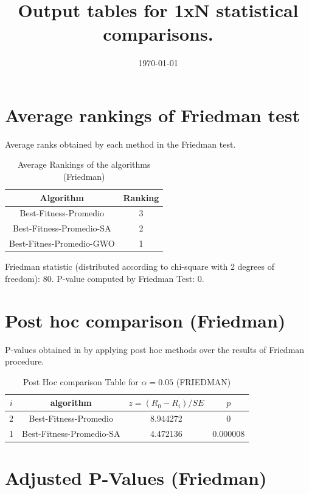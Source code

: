 \documentclass[a4paper,10pt]{article}
\title{Output tables for 1xN statistical comparisons.}
\author{}
\date{\today}
\begin{document}
\begin{landscape}
\pagestyle{empty}
\maketitle
\thispagestyle{empty}

\section{Average rankings of Friedman test}


Average ranks obtained by each method in the Friedman test.

\begin{table}[!htp]
\centering
\begin{tabular}{|c|c|}\hline
Algorithm&Ranking\\\hline
Best-Fitness-Promedio&3\\Best-Fitness-Promedio-SA&2\\Best-Fitnes-Promedio-GWO&1\\\hline\end{tabular}
\caption{Average Rankings of the algorithms (Friedman)}
\end{table}

Friedman statistic (distributed according to chi-square with 2 degrees of freedom): 80. \newline P-value computed by Friedman Test: 0.\newline


\newpage

\section{Post hoc comparison (Friedman)}


P-values obtained in by applying post hoc methods over the results of Friedman procedure.

\begin{table}[!htp]
\centering\footnotesize
\begin{tabular}{cccc}
$i$&algorithm&$z=(R_0 - R_i)/SE$&$p$\\
\hline2&Best-Fitness-Promedio&8.944272&0\\1&Best-Fitness-Promedio-SA&4.472136&0.000008\\\hline
\end{tabular}
\caption{Post Hoc comparison Table for $\alpha=0.05$ (FRIEDMAN)}
\end{table}
\newpage

\section{Adjusted P-Values (Friedman)}



\end{landscape}
\end{document}

